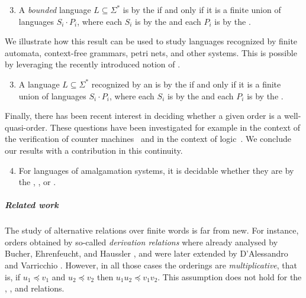 {
\renewcommand{\labelenumi}{R\arabic{enumi}}
\begin{enumerate}
	\setcounter{enumi}{2}
    \item A \emph{bounded} language $L \subseteq \Sigma^*$ is  by the  if and only if it is a finite union of languages $S_i \cdot P_i$, where each $S_i$ is  by the  and each $P_i$ is  by the .
\end{enumerate}
}

We illustrate how this result can be used to study languages recognized by
finite automata, context-free grammars, petri nets, and other systems. This is
possible by leveraging the recently introduced notion of  \cite{ASZZ24}.

{
\renewcommand{\labelenumi}{R\arabic{enumi}}
\begin{enumerate}
	\setcounter{enumi}{2}
	\item A language $L \subseteq \Sigma^*$ recognized by an  is  by the  if and only if it is a finite union of languages $S_i \cdot P_i$, where each $S_i$ is  by the  and each $P_i$ is  by the .
\end{enumerate}
}



Finally, there has been recent interest in deciding whether a given order is a well-quasi-order. These questions have been investigated for example in the context of the verification of counter machines~\cite{DBLP:conf/fsttcs/FinkelG19} and in the context of logic~\cite{DBLP:journals/pacmpl/BergstrasserGLZ24}. We conclude our results with a contribution in this continuity.

{
\renewcommand{\labelenumi}{R\arabic{enumi}}
\begin{enumerate}
	\setcounter{enumi}{3}
	\item For languages of amalgamation systems, it is decidable whether they are  by the , , or .
\end{enumerate}
}

\subparagraph{Related work} The study of alternative 
relations over finite words is far from new. For instance, orders obtained by
so-called \emph{derivation relations} where already analysed by Bucher,
Ehrenfeucht, and Haussler \cite{BUEUD85}, and were later extended by
D'Alessandro and Varricchio \cite{ALVA03,ALVA06}. However, in all those cases
the orderings are \emph{multiplicative}, that is, if $u_1 \preceq v_1$ and $u_2
\preceq v_2$ then $u_1u_2 \preceq v_1v_2$. This assumption does not hold for
the , , and  relations.

